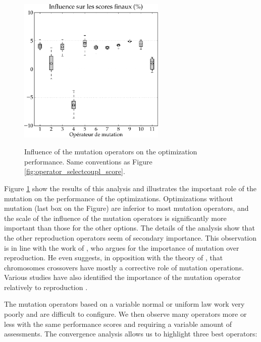 \documentclass[twocol]{ametsoc}
\begin{document}
\begin{figure}[htb]
	\begin{center}
		\noindent\includegraphics[width=7cm,angle=0]{figures/operator_mutation_score.pdf}\\
	\end{center}
	\caption{Influence of the mutation operators on the optimization performance. Same conventions as Figure \ref{fig:operator_selectcoupl_score}.}
	\label{fig:operator_mutation_score}
\end{figure}


Figure \ref{fig:operator_mutation_score} show the results of this analysis and illustrates the important role of the mutation on the performance of the optimizations. Optimizations without mutation (last box on the Figure) are inferior to most mutation operators, and the scale of the influence of the mutation operators is significantly more important than those for the other options. The details of the analysis \citep[see][]{Horton2012a} show that the other reproduction operators seem of secondary importance. This observation is in line with the work of \citet{Back1996a}, who argues for the importance of mutation over reproduction. He even suggests, in opposition with the theory of \citet{Holland1992a}, that chromosomes crossovers have mostly a corrective role of mutation operations. Various studies have also identified the importance of the mutation operator relatively to reproduction \citep[see eg.][]{Back1992a, Back1996b, Smith1997a, Deb1999, Haupt2004, Costa2005a, Costa2007a}.

The mutation operators based on a variable normal or uniform law work very poorly and are difficult to configure. We then observe many operators more or less with the same performance scores and requiring a variable amount of assessments. The convergence analysis \citep[see][]{Horton2012a} allows us to highlight three best operators:
\end{document}
